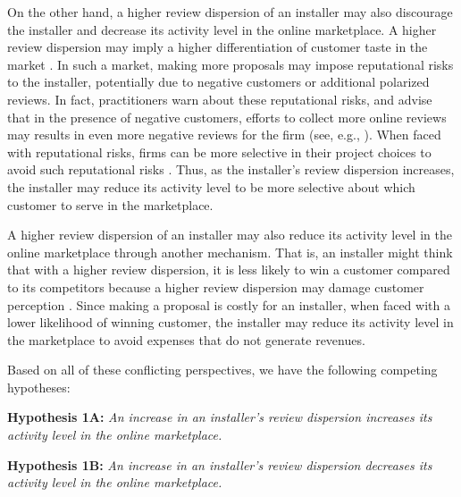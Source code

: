 \documentclass[mnsc,blindrev]{informs3}
\begin{document}
	On the other hand, a higher review dispersion of an installer may also discourage the installer and decrease its activity level in the online marketplace. A higher review dispersion may imply a higher differentiation of customer taste in the market \citep{clemons2006online}. In such a market, making more proposals may impose reputational risks to the installer, potentially due to negative customers or additional polarized reviews. In fact, practitioners warn about these reputational risks, and advise that in the presence of negative customers, efforts to collect more online reviews may results in even more negative reviews for the firm (see, e.g., \citep{Neil}). When faced with reputational risks, firms can be more selective in their project choices to avoid such reputational risks \citep{demirag2011risks,hirshleifer1992managerial}. Thus, as the installer's review dispersion increases, the installer may reduce its activity level to be more selective about which customer to serve in the marketplace.

A higher review dispersion of an installer may also reduce its activity level in the online marketplace through another mechanism. That is, an installer might think that with a higher review dispersion, it is less likely to win a customer compared to its competitors because a higher review dispersion may damage customer perception \citep{Zhu}. Since making a proposal is costly for an installer, when faced with a lower likelihood of winning customer, the installer may reduce its activity level in the marketplace to avoid expenses that do not generate revenues.

 Based on all of these conflicting perspectives, we have the following competing hypotheses:

	
	\noindent\textbf{Hypothesis 1A:} \emph{An increase in an installer's review dispersion increases its activity level in the online marketplace.}
	
	\noindent\textbf{Hypothesis 1B:} \emph{An increase in an installer's review dispersion decreases its activity level in the online marketplace.}


\end{document}
